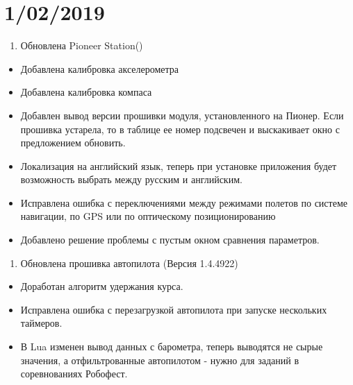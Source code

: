 \documentclass[a4paper,10pt,russian]{sphinxmanual}
\begin{document}
\section{1/02/2019}
\label{\detokenize{changelog:id5}}\begin{enumerate}
\def\theenumi{\arabic{enumi}}
\def\labelenumi{\theenumi .}
\makeatletter\def\p@enumii{\p@enumi \theenumi .}\makeatother
\item {} 
Обновлена Pioneer Station()

\end{enumerate}
\begin{itemize}
\item {} 
Добавлена калибровка акселерометра

\item {} 
Добавлена калибровка компаса

\item {} 
Добавлен вывод версии прошивки модуля, установленного на Пионер. Если прошивка устарела, то в таблице ее номер подсвечен и выскакивает окно с предложением обновить.

\item {} 
Локализация на английский язык, теперь при установке приложения будет возможность выбрать между русским и английским.

\item {} 
Исправлена ошибка с переключениями между режимами полетов по системе навигации, по GPS или по оптическому позиционированию

\item {} 
Добавлено решение проблемы с пустым окном сравнения параметров.

\end{itemize}
\begin{enumerate}
\def\theenumi{\arabic{enumi}}
\def\labelenumi{\theenumi .}
\makeatletter\def\p@enumii{\p@enumi \theenumi .}\makeatother
\setcounter{enumi}{1}
\item {} 
Обновлена прошивка автопилота (Версия 1.4.4922)

\end{enumerate}
\begin{itemize}
\item {} 
Доработан алгоритм удержания курса.

\item {} 
Исправлена ошибка с перезагрузкой автопилота при запуске нескольких таймеров.

\item {} 
В Lua изменен вывод данных с барометра, теперь выводятся не сырые значения, а отфильтрованные автопилотом - нужно для заданий в соревнованиях Робофест.

\end{itemize}
\end{document}
